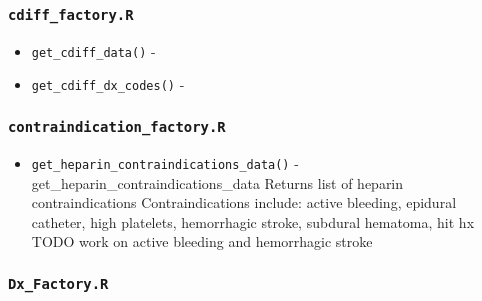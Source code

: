 \documentclass[
]{book}
\providecommand{\tightlist}{%
  \setlength{\itemsep}{0pt}\setlength{\parskip}{0pt}}
\begin{document}
\hypertarget{cdiff_factory.r}{%
\subsubsection{\texorpdfstring{\texttt{cdiff\_factory.R}}{cdiff\_factory.R}}\label{cdiff_factory.r}}

\begin{itemize}
\tightlist
\item
  \texttt{get\_cdiff\_data()} -
\item
  \texttt{get\_cdiff\_dx\_codes()} -
\end{itemize}

\hypertarget{contraindication_factory.r}{%
\subsubsection{\texorpdfstring{\texttt{contraindication\_factory.R}}{contraindication\_factory.R}}\label{contraindication_factory.r}}

\begin{itemize}
\tightlist
\item
  \texttt{get\_heparin\_contraindications\_data()} - get\_heparin\_contraindications\_data Returns list of heparin contraindications Contraindications include: active bleeding, epidural catheter, high platelets, hemorrhagic stroke, subdural hematoma, hit hx TODO work on active bleeding and hemorrhagic stroke
\end{itemize}

\hypertarget{dx_factory.r}{%
\subsubsection{\texorpdfstring{\texttt{Dx\_Factory.R}}{Dx\_Factory.R}}\label{dx_factory.r}}
\end{document}
